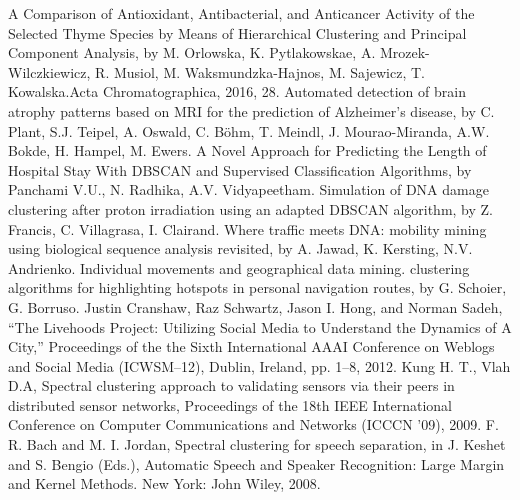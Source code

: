 \begin{thebibliography}{99}
 A Comparison of Antioxidant, Antibacterial, and Anticancer Activity of the Selected Thyme Species by Means of Hierarchical Clustering and Principal Component Analysis, by M. Orlowska, K. Pytlakowskae, A. Mrozek-Wilczkiewicz, R. Musiol, M. Waksmundzka-Hajnos, M. Sajewicz, T. Kowalska.Acta Chromatographica, 2016, 28.
 Automated detection of brain atrophy patterns based on MRI for the prediction of Alzheimer's disease, by C. Plant, S.J. Teipel, A. Oswald, C. Böhm, T. Meindl, J. Mourao-Miranda, A.W. Bokde, H. Hampel, M. Ewers. 
 A Novel Approach for Predicting the Length of Hospital Stay With DBSCAN and Supervised Classification Algorithms, by Panchami V.U., N. Radhika, A.V. Vidyapeetham. 
 Simulation of DNA damage clustering after proton irradiation using an adapted DBSCAN algorithm, by Z. Francis, C. Villagrasa, I. Clairand. 
 Where traffic meets DNA: mobility mining using biological sequence analysis revisited, by A. Jawad, K. Kersting, N.V. Andrienko. 
 Individual movements and geographical data mining. clustering algorithms for highlighting hotspots in personal navigation routes, by G. Schoier, G. Borruso. 
 Justin Cranshaw, Raz Schwartz, Jason I. Hong, and Norman Sadeh, ``The Livehoods Project: Utilizing Social Media to Understand the Dynamics of A City,'' Proceedings of the the Sixth International AAAI Conference on Weblogs and Social Media (ICWSM--12), Dublin, Ireland, pp. 1--8, 2012.
 Kung H. T., Vlah D.A, Spectral clustering approach to validating sensors via their peers in distributed sensor networks, Proceedings of the 18th IEEE International Conference on Computer Communications and Networks (ICCCN '09), 2009.
 F. R. Bach and M. I. Jordan, Spectral clustering for speech separation, in J. Keshet and S. Bengio (Eds.), Automatic Speech and Speaker Recognition: Large Margin and Kernel Methods. New York: John Wiley, 2008.
  
 
 
 

\end{thebibliography}
